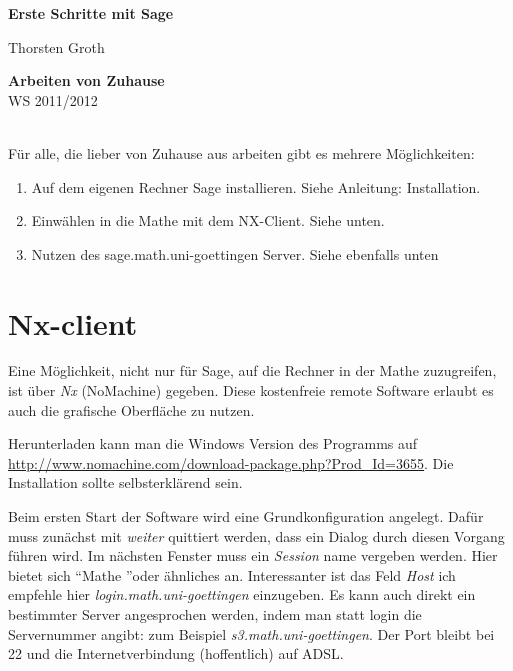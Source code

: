 \documentclass[a4paper,10pt,DIV15]{scrartcl}
\begin{document}

\begin{center}
\textbf{\LARGE Erste Schritte mit Sage}\\
\end{center}
\begin{minipage}{6cm}
Thorsten Groth
\end{minipage}\hfill
\begin{minipage}{2.5cm}
\begin{flushright}
\textbf{Arbeiten von Zuhause}\\
WS 2011/2012
\end{flushright}
\end{minipage}\\[1cm]


Für alle, die lieber von Zuhause aus arbeiten gibt es mehrere Möglichkeiten:
\begin{enumerate}
 \item Auf dem eigenen Rechner Sage installieren. Siehe Anleitung: Installation.
 \item Einwählen in die Mathe mit dem NX-Client. Siehe unten.
 \item Nutzen des sage.math.uni-goettingen Server. Siehe ebenfalls unten
\end{enumerate}


\section{Nx-client}
Eine Möglichkeit, nicht nur für Sage, auf die Rechner in der Mathe zuzugreifen, ist über \emph{Nx} (NoMachine) gegeben. Diese kostenfreie 
remote Software erlaubt es auch die grafische Oberfläche zu nutzen. 

Herunterladen kann man die Windows Version des Programms auf \url{http://www.nomachine.com/download-package.php?Prod_Id=3655}. Die Installation
sollte selbsterklärend sein. 

Beim ersten Start der Software wird eine Grundkonfiguration angelegt. Dafür muss zunächst mit \emph{weiter} quittiert werden, dass ein Dialog
durch diesen Vorgang führen wird. 
Im nächsten Fenster muss ein \emph{Session} name vergeben werden. Hier bietet sich \textquotedblleft Mathe  \textquotedblright oder ähnliches an.
Interessanter ist das Feld \emph{Host} ich empfehle hier \emph{login.math.uni-goettingen} einzugeben. Es kann auch direkt ein bestimmter Server
angesprochen werden, indem man statt login die Servernummer angibt: zum Beispiel \emph{s3.math.uni-goettingen}.
Der Port bleibt bei 22 und die Internetverbindung (hoffentlich) auf ADSL. 
\end{document}
